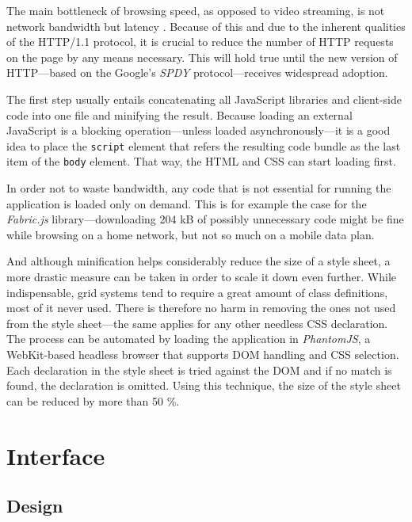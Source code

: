 \documentclass[thesis=M,english,hidelinks]{FITthesis}[2012/10/20]
\newcommand{\code}{\texttt}
\begin{document}
The main bottleneck of browsing speed, as opposed to video streaming, is not network bandwidth but latency \cite{grigorik}. Because of this and due to the inherent qualities of the HTTP/1.1 protocol, it is crucial to reduce the number of HTTP requests on the page by any means necessary. This will hold true until the new version of HTTP---based on the Google's \textit{SPDY} protocol---receives widespread adoption.

The first step usually entails concatenating all JavaScript libraries and client-side code into one file and minifying the result. Because loading an external JavaScript is a blocking operation---unless loaded asynchronously---it is a good idea to place the \code{script} element that refers the resulting code bundle as the last item of the \code{body} element. That way, the HTML and CSS can start loading first.

In order not to waste bandwidth, any code that is not essential for running the application is loaded only on demand. This is for example the case for the \textit{Fabric.js} library---downloading 204 kB of possibly unnecessary code might be fine while browsing on a home network, but not so much on a mobile data plan.

And although minification helps considerably reduce the size of a style sheet, a more drastic measure can be taken in order to scale it down even further. While indispensable, grid systems tend to require a great amount of class definitions, most of it never used. There is therefore no harm in removing the ones not used from the style sheet---the same applies for any other needless CSS declaration. The process can be automated by loading the application in \textit{PhantomJS}, a WebKit-based headless browser that supports DOM handling and CSS selection. Each declaration in the style sheet is tried against the DOM and if no match is found, the declaration is omitted. Using this technique, the size of the style sheet can be reduced by more than 50 \%.

\section{Interface}

  \subsection{Design}
\end{document}
